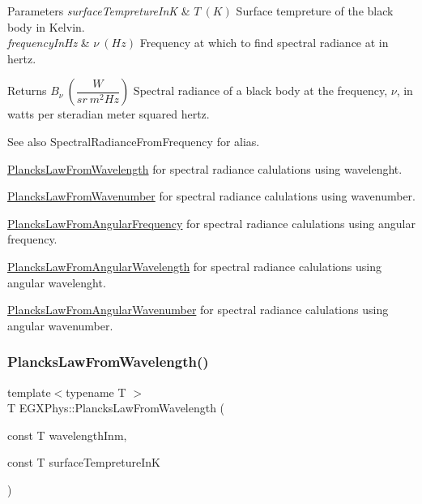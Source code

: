 \begin{DoxyParams}{Parameters}
{\em surface\+Tempreture\+InK} & $T\ (K)$ Surface tempreture of the black body in Kelvin. \\
\hline
{\em frequency\+In\+Hz} & $\nu\ (Hz)$ Frequency at which to find spectral radiance at in hertz. \\
\hline
\end{DoxyParams}
\begin{DoxyReturn}{Returns}
$B_{\nu}\ ( \dfrac{W}{sr\ m^2 Hz})$ Spectral radiance of a black body at the frequency, $\nu$, in watts per steradian meter squared hertz. 
\end{DoxyReturn}
\begin{DoxySeeAlso}{See also}
Spectral\+Radiance\+From\+Frequency for alias. 

\mbox{\hyperlink{group___e_g_x_phys-_electrodynamics-_black_body-_plancks_law_ga54639bc031ded51ef78aa82b0457a4dd}{Plancks\+Law\+From\+Wavelength}} for spectral radiance calulations using wavelenght. 

\mbox{\hyperlink{group___e_g_x_phys-_electrodynamics-_black_body-_plancks_law_ga6648ae2a0fbff6735c1e1a04c7cac746}{Plancks\+Law\+From\+Wavenumber}} for spectral radiance calulations using wavenumber. 

\mbox{\hyperlink{group___e_g_x_phys-_electrodynamics-_black_body-_plancks_law_gaac540560c71e30c02b91d22e417b5863}{Plancks\+Law\+From\+Angular\+Frequency}} for spectral radiance calulations using angular frequency. 

\mbox{\hyperlink{group___e_g_x_phys-_electrodynamics-_black_body-_plancks_law_ga7322124727f968d28807e918c5eeb23f}{Plancks\+Law\+From\+Angular\+Wavelength}} for spectral radiance calulations using angular wavelenght. 

\mbox{\hyperlink{group___e_g_x_phys-_electrodynamics-_black_body-_plancks_law_gaa3d3e0fdb77d25bdd40523f9975de902}{Plancks\+Law\+From\+Angular\+Wavenumber}} for spectral radiance calulations using angular wavenumber. 
\end{DoxySeeAlso}
\mbox{\label{group___e_g_x_phys-_electrodynamics-_black_body-_plancks_law_ga54639bc031ded51ef78aa82b0457a4dd}} 
\subsubsection{\texorpdfstring{Plancks\+Law\+From\+Wavelength()}{PlancksLawFromWavelength()}}
{\footnotesize\ttfamily template$<$typename T $>$ \\
T E\+G\+X\+Phys\+::\+Plancks\+Law\+From\+Wavelength (\begin{DoxyParamCaption}\item[{const T}]{wavelength\+Inm,  }\item[{const T}]{surface\+Tempreture\+InK }\end{DoxyParamCaption})}



